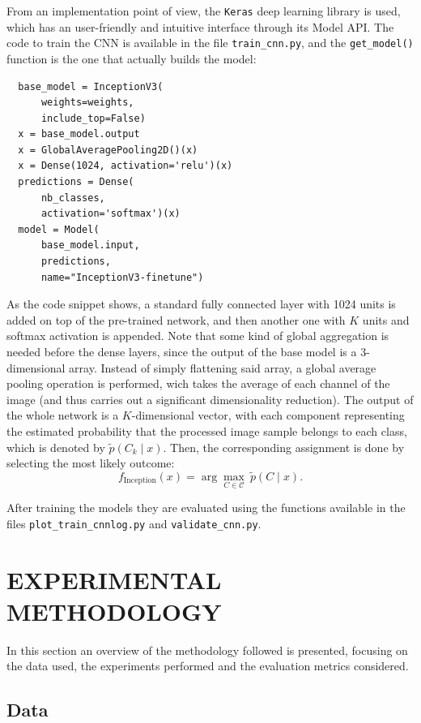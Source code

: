 \documentclass[letterpaper, 10 pt, conference]{IEEEtran}
\begin{document}
From an implementation point of view, the \texttt{Keras} deep learning library \cite{keras} is used, which has an user-friendly and intuitive interface through its Model API. The code to train the CNN is available in the file \texttt{train\_cnn.py}, and the \texttt{get\_model()} function is the one that actually builds the model:

\begin{verbatim}
  base_model = InceptionV3(
      weights=weights,
      include_top=False)
  x = base_model.output
  x = GlobalAveragePooling2D()(x)
  x = Dense(1024, activation='relu')(x)
  predictions = Dense(
      nb_classes,
      activation='softmax')(x)
  model = Model(
      base_model.input,
      predictions,
      name="InceptionV3-finetune")
\end{verbatim}

As the code snippet shows, a standard fully connected layer with 1024 units is added on top of the pre-trained network, and then another one with $K$ units and softmax activation is appended. Note that some kind of global aggregation is needed before the dense layers, since the output of the base model is a 3-dimensional array. Instead of simply flattening said array, a global average pooling operation is performed, wich takes the average of each channel of the image (and thus carries out a significant dimensionality reduction). The output of the whole network is a $K$-dimensional vector, with each component representing the estimated probability that the processed image sample belongs to each class, which is denoted by $\tilde p(C_k\mid x)$. Then, the corresponding assignment is done by selecting the most likely outcome:
\[
f_{\text{Inception}}(x) = \arg \max_{C\in\mathcal C} \ \tilde p(C\mid x).
\]

After training the models they are evaluated using the functions available in the files \texttt{plot\_train\_cnnlog.py} and \texttt{validate\_cnn.py}.

\section{EXPERIMENTAL METHODOLOGY}
\label{sec:methodology}

In this section an overview of the methodology followed is presented, focusing on the data used, the experiments performed and the evaluation metrics considered.
\subsection{Data}
\end{document}
